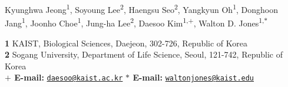 Kyunghwa Jeong\textsuperscript{1},
Soyoung Lee\textsuperscript{2},
Haengsu Seo\textsuperscript{2},
Yangkyun Oh\textsuperscript{1},
Donghoon Jang\textsuperscript{1},
Joonho Choe\textsuperscript{1},
Jung-ha Lee\textsuperscript{2},
Daesoo Kim\textsuperscript{1,$+$},
Walton D. Jones\textsuperscript{1,$\ast$}

{\bf 1} KAIST, Biological Sciences, Daejeon, 302-726, Republic of Korea
\\
{\bf 2} Sogang University, Department of Life Science, Seoul, 121-742, Republic of Korea
\\
{\bf $+$ E-mail:} \href{mailto:daesoo@kaist.ac.kr}{\nolinkurl{daesoo@kaist.ac.kr}}
{\bf $\ast$ E-mail:} \href{mailto:waltonjones@kaist.edu}{\nolinkurl{waltonjones@kaist.edu}}
    
  